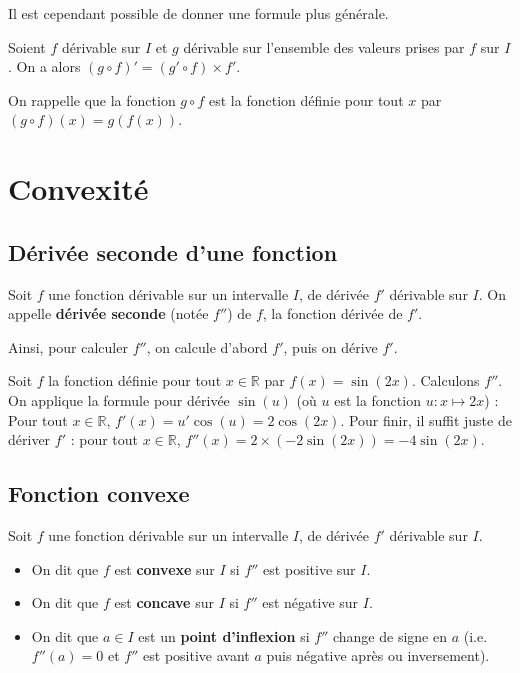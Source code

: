 	Il est cependant possible de donner une formule plus générale.
	
	\begin{formula}
		Soient $f$ dérivable sur $I$ et $g$ dérivable sur l'ensemble des valeurs prises par $f$ sur $I$. On a alors $(g \circ f)' = (g' \circ f) \times f'$.
	\end{formula}
	
	\begin{tip}
		On rappelle que la fonction $g \circ f$ est la fonction définie pour tout $x$ par $(g \circ f)(x) = g(f(x))$.
	\end{tip}
	
	\section{Convexité}
	
	\subsection{Dérivée seconde d'une fonction}
	
	\begin{formula}[Définition]
		Soit $f$ une fonction dérivable sur un intervalle $I$, de dérivée $f'$ dérivable sur $I$.
		\newpar
		On appelle \textbf{dérivée seconde} (notée $f''$) de $f$, la fonction dérivée de $f'$.
	\end{formula}
	
	Ainsi, pour calculer $f''$, on calcule d'abord $f'$, puis on dérive $f'$.
	
	\begin{tip}[Exemple]
		Soit $f$ la fonction définie pour tout $x \in \mathbb{R}$ par $f(x) = \sin(2x)$. Calculons $f''$.
		\newpar
		On applique la formule pour dérivée $\sin(u)$ (où $u$ est la fonction $u : x \mapsto 2x$) :
		\newpar
		Pour tout $x \in \mathbb{R}$, $f'(x) = u' \cos(u) = 2 \cos(2x)$.
		\newpar
		Pour finir, il suffit juste de dériver $f'$ : pour tout $x \in \mathbb{R}$, $f''(x) = 2 \times (-2 \sin(2x)) = -4 \sin(2x)$.
	\end{tip}
	
	\subsection{Fonction convexe}
	
	\begin{formula}[Définition]
		Soit $f$ une fonction dérivable sur un intervalle $I$, de dérivée $f'$ dérivable sur $I$.
		\begin{itemize}
			\item On dit que $f$ est \textbf{convexe} sur $I$ si $f''$ est positive sur $I$.
			\item On dit que $f$ est \textbf{concave} sur $I$ si $f''$ est négative sur $I$.
			\item On dit que $a \in I$ est un \textbf{point d'inflexion} si $f''$ change de signe en $a$ (i.e. $f''(a) = 0$ et $f''$ est positive avant $a$ puis négative après ou inversement).
		\end{itemize}
	\end{formula}
	
